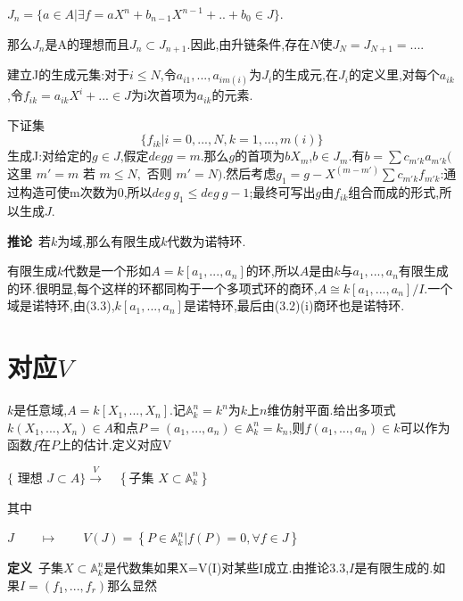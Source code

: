 \documentclass[UTF8]{book}
\begin{document}
		
		\begin{center}
			$J_{n}=\{a\in A|\exists f=aX^{n}+b_{n-1}X^{n-1}+..+b_{0}\in J\}$.
		\end{center}
		
		
		那么$J_{n}$是A的理想而且$J_{n} \subset J_{n+1}$.因此,由升链条件,存在$ N $使$J_{N}=J_{N+1}=...$.
		
		
		建立J的生成元集:对于$i \leqslant N$,令$a_{i1},...,a_{im(i)}$为$J_{i}$的生成元,在$J_{i}$的定义里,对每个$a_{ik}$,令$f_{ik}=a_{ik}X^{i}+...\in J$为i次首项为$a_{ik}$的元素.
		
		
		下证集
		\begin{equation*}
			\{f_{ik}|i=0,...,N,k=1,...,m(i)\}
		\end{equation*}
		生成J:对给定的$g\in J$,假定$ deg g = m $.那么$ g $的首项为$bX_{m}$,$b\in J_{m}$.有$b=\sum c_{m'k}a_{m'k}($ 这里 $m'=m$ 若 $m\leqslant N,$ 否则 $m'=N)$.然后考虑$g_{1}=g-X^{(m-m')} \sum c_{m'k}f_{m'k}$:通过构造可使m次数为0,所以$deg\ g_{1} \leqslant deg\ g-1$;最终可写出$ g $由$f_{ik}$组合而成的形式,所以生成$ J $.
		
		
		\textbf{推论}\ 若$ k $为域,那么有限生成$ k $代数为诺特环.
		
		
		有限生成$ k $代数是一个形如$A=k[a_{1},...,a_{n}]$的环,所以$ A $是由$ k $与$a_{1},...,a_{n}$有限生成的环.很明显,每个这样的环都同构于一个多项式环的商环,$A \cong k[a_{1},...,a_{n}]/I$.一个域是诺特环,由(3.3),$k[a_{1},...,a_{n}]$是诺特环,最后由(3.2)(i)商环也是诺特环.
		
		
	\section{对应$ V $}
		$ k $是任意域,$A=k[X_{1},...,X_{n}]$.记$\mathbb{A}^{n}_{k}=k^{n}$为$ k $上$ n $维仿射平面.给出多项式$k(X_{1},...,X_{n})\in A$和点$P=(a_{1},...,a_{n}) \in \mathbb{A}^{n}_{k}=k_{n}$,则$f(a_{1},...,a_{n}) \in k$可以作为函数$ f $在$ P $上的估计.定义对应V
		
		\begin{center}
		$\{\text { 理想 } J \subset A \} \stackrel{ V }{\longrightarrow} \quad\left\{\text {子集 } X \subset \mathbb{A} ^{ n }_{ k }\right\}$
		\end{center}
		
		其中
		\begin{center}
		\qquad\qquad\qquad\qquad$J\qquad \mapsto \qquad V(J)=\left\{P \in \mathbb{A} ^{n}_{k} | f(P)=0 ,\forall f \in J\right\}$
	\end{center}
		\textbf{定义}\ 子集$X \subset \mathbb{A}^{n}_{k}$是代数集如果X=V(I)对某些I成立.由推论3.3,$ I $是有限生成的.如果$I=(f_{1},...,f_{r})$那么显然
		
\end{document}
